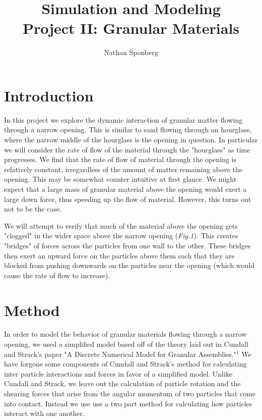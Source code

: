 \documentclass{article}%
\newcommand{\tab} {\hspace{5mm}}
\begin{document}
\title{Simulation and Modeling\\Project II: Granular Materials}
\author{Nathan Sponberg}
\maketitle

\twocolumn

\section{Introduction}
\tab In this project we explore the dynamic interaction of granular matter flowing through a narrow opening. This is similar to sand flowing through an hourglass, where the narrow middle of the hourglass is the opening in question. In particular we will consider the rate of flow of the material through the "hourglass" as time progresses. We find that the rate of flow of material through the opening is relatively constant, irregardless of the amount of matter remaining above the opening. This may be somewhat counter intuitive at first glance. We might expect that a large mass of granular material above the opening would exert a large down force, thus speeding up the flow of material. However, this turns out not to be the case.

	We will attempt to verify that much of the material above the opening gets "clogged" in the wider space above the narrow opening (\textit{Fig.1}). This creates "bridges" of forces across the particles from one wall to the other. These bridges then exert an upward force on the particles above them such that they are blocked from pushing downwards on the particles near the opening (which would cause the rate of flow to increase). %
\section{Method}
\tab In order to model the behavior of granular materials flowing through a narrow opening, we used a simplified model based off of the theory laid out in Cundall and Strack's paper "A Discrete Numerical Model for Granular Assemblies."$^1$ We have forgone some components of Cundall and Strack's method for calculating inter particle interactions and forces in favor of a simplified model. Unlike Cundall and Strack, we leave out the calculation of particle rotation and the shearing forces that arise from the angular momentum of two particles that come into contact. Instead we use use a two part method for calculating how particles interact with one another.
	
\end{document}
